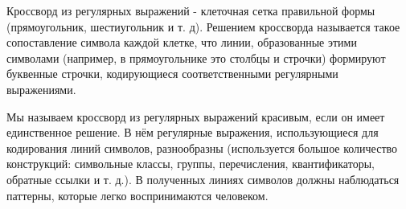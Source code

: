\documentclass[12pt]{report}
\begin{document}
   Кроссворд из регулярных выражений - клеточная сетка правильной формы (прямоугольник, шестиугольник и т. д). Решением кроссворда называется такое сопоставление символа каждой клетке, что линии, образованные этими символами (например, в прямоугольнике это столбцы и строчки) формируют буквенные строчки, кодирующиеся соответственными регулярными выражениями.
   
   Мы называем кроссворд из регулярных выражений красивым, если он имеет единственное решение. В нём регулярные выражения, использующиеся для кодирования линий символов, разнообразны (используется большое количество конструкций: символьные классы, группы, перечисления, квантификаторы, обратные ссылки и т. д.). В полученных линиях символов должны наблюдаться паттерны, которые легко воспринимаются человеком.

    \newpage %
\end{document}
